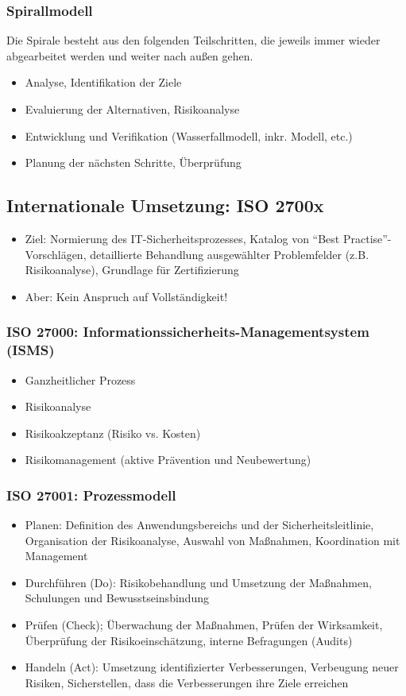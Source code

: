 \subsubsection{Spirallmodell}
Die Spirale besteht aus den folgenden Teilschritten, die jeweils immer wieder abgearbeitet werden und weiter nach außen gehen.
\begin{itemize}
	\item Analyse, Identifikation der Ziele
	\item Evaluierung der Alternativen, Risikoanalyse
	\item Entwicklung und Verifikation (Wasserfallmodell, inkr. Modell, etc.)
	\item Planung der nächsten Schritte, Überprüfung
\end{itemize}

\subsection{Internationale Umsetzung: ISO 2700x}

\begin{itemize}
	\item Ziel: Normierung des IT-Sicherheitsprozesses, Katalog von "`Best Practise"'-Vorschlägen, detaillierte Behandlung ausgewählter Problemfelder (z.B. Risikoanalyse), Grundlage für Zertifizierung
	\item Aber: Kein Anspruch auf Vollständigkeit!
\end{itemize}

\subsubsection{ISO 27000: Informationssicherheits-Managementsystem (ISMS)}
\begin{itemize}
	\item Ganzheitlicher Prozess
	\item Risikoanalyse
	\item Risikoakzeptanz (Risiko vs. Kosten)
	\item Risikomanagement (aktive Prävention und Neubewertung)
\end{itemize}

\subsubsection{ISO 27001: Prozessmodell}
\begin{itemize}
	\item Planen: Definition des Anwendungsbereichs und der Sicherheitsleitlinie, Organisation der Risikoanalyse, Auswahl von Maßnahmen, Koordination mit Management
	\item Durchführen (Do): Risikobehandlung und Umsetzung der Maßnahmen, Schulungen und Bewusstseinsbindung
	\item Prüfen (Check); Überwachung der Maßnahmen, Prüfen der Wirksamkeit, Überprüfung der Risikoeinschätzung, interne Befragungen (Audits)
	\item Handeln (Act): Umsetzung identifizierter Verbesserungen, Verbeugung neuer Risiken, Sicherstellen, dass die Verbesserungen ihre Ziele erreichen
\end{itemize}

